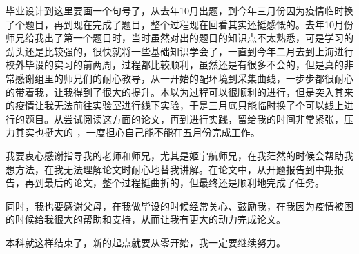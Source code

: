\begin{thanksfor}
毕业设计到这里要画一个句号了，从去年10月出题，到今年三月份因为疫情临时换了个题目，再到现在完成了题目，整个过程现在回看其实还挺感慨的。去年10月份师兄给我出了第一个题目时，当时虽然对出的题目的知识点不太熟悉，可是学习的劲头还是比较强的，很快就将一些基础知识学会了，一直到今年二月去到上海进行校外毕设的实习的前两周，过程都比较顺利，虽然还是有很多不会的，但是真的非常感谢组里的师兄们的耐心教导，从一开始的配环境到采集曲线，一步步都很耐心的带着我，让我得到了很大的提升。本以为过程可以很顺利的进行，但是突入其来的疫情让我无法前往实验室进行线下实验，于是三月底只能临时换了个可以线上进行的题目。从尝试阅读这方面的论文，再到进行实践，留给我的时间非常紧张，压力其实也挺大的 ，一度担心自己能不能在五月份完成工作。

我要衷心感谢指导我的老师和师兄，尤其是姬宇航师兄，在我茫然的时候会帮助我想方法，在我无法理解论文时耐心地替我讲解。在论文中，从开题报告到中期报告，再到最后的论文，整个过程挺曲折的，但最终还是顺利地完成了任务。

同时，我也要感谢父母，在我做毕设的时候经常关心、鼓励我，在我因为疫情被困的时候给我很大的帮助和支持，从而让我有更大的动力完成论文。

本科就这样结束了，新的起点就要从零开始，我一定要继续努力。

\end{thanksfor}